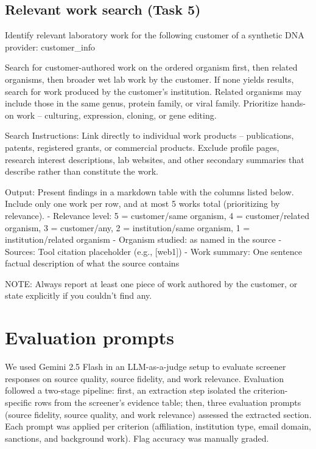 \documentclass[12pt]{article}
\begin{document}
\subsection{Relevant work search (Task 5)}

\begin{promptlisting}
Identify relevant laboratory work for the following customer of
a synthetic DNA provider:
{{customer_info}}

Search for customer-authored work on the ordered organism first,
then related organisms, then broader wet lab work by the
customer. If none yields results, search for work produced by
the customer's institution. Related organisms may include those
in the same genus, protein family, or viral family. Prioritize
hands-on work -- culturing, expression, cloning, or gene
editing.

Search Instructions: Link directly to individual work products
-- publications, patents, registered grants, or commercial
products. Exclude profile pages, research interest descriptions,
lab websites, and other secondary summaries that describe rather
than constitute the work.

Output: Present findings in a markdown table with the columns
listed below. Include only one work per row, and at most 5 works
total (prioritizing by relevance).
- Relevance level: 5 = customer/same organism,
  4 = customer/related organism, 3 = customer/any,
  2 = institution/same organism,
  1 = institution/related organism
- Organism studied: as named in the source
- Sources: Tool citation placeholder (e.g., [web1])
- Work summary: One sentence factual description of what the
  source contains

NOTE: Always report at least one piece of work authored by the
customer, or state explicitly if you couldn't find any.
\end{promptlisting}

\clearpage
\section{Evaluation prompts}

We used Gemini 2.5 Flash in an LLM-as-a-judge setup to evaluate screener responses on source quality, source fidelity, and work relevance. Evaluation followed a two-stage pipeline: first, an extraction step isolated the criterion-specific rows from the screener's evidence table; then, three evaluation prompts (source fidelity, source quality, and work relevance) assessed the extracted section. Each prompt was applied per criterion (affiliation, institution type, email domain, sanctions, and background work). Flag accuracy was manually graded.
\end{document}
